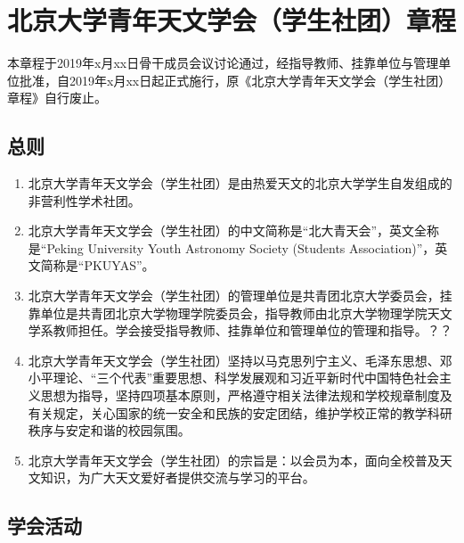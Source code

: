 \chapter{北京大学青年天文学会（学生社团）章程}

本章程于2019年x月xx日骨干成员会议讨论通过，经指导教师、挂靠单位与管理单位批准，自2019年x月xx日起正式施行，原《北京大学青年天文学会（学生社团）章程》自行废止。

\section{总则}

\begin{enumerate}
    \item 北京大学青年天文学会（学生社团）是由热爱天文的北京大学学生自发组成的非营利性学术社团。
    
    \item 北京大学青年天文学会（学生社团）的中文简称是“北大青天会”，英文全称是“Peking University Youth Astronomy Society (Students Association)”，英文简称是“PKUYAS”。
    
    \item 北京大学青年天文学会（学生社团）的管理单位是共青团北京大学委员会，挂靠单位是共青团北京大学物理学院委员会，指导教师由北京大学物理学院天文学系教师担任。学会接受指导教师、挂靠单位和管理单位的管理和指导。？？
    
    \item 北京大学青年天文学会（学生社团）坚持以马克思列宁主义、毛泽东思想、邓小平理论、“三个代表”重要思想、科学发展观和习近平新时代中国特色社会主义思想为指导，坚持四项基本原则，严格遵守相关法律法规和学校规章制度及有关规定，关心国家的统一安全和民族的安定团结，维护学校正常的教学科研秩序与安定和谐的校园氛围。
    
    \item 北京大学青年天文学会（学生社团）的宗旨是：以会员为本，面向全校普及天文知识，为广大天文爱好者提供交流与学习的平台。
\end{enumerate}

\section{学会活动}

